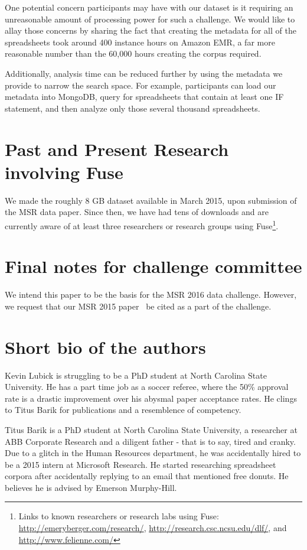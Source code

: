 \documentclass[conference]{IEEEtran}
\begin{document}
One potential concern participants may have with our dataset is it requiring an unreasonable amount of processing power for such a challenge.
We would like to allay those concerns by sharing the fact that creating the metadata for all of the spreadsheets took around 400 instance hours on Amazon EMR, a far more reasonable number than the 60,000 hours creating the corpus required.

Additionally, analysis time can be reduced further by using the metadata we provide to narrow the search space.
For example, participants can load our metadata into MongoDB, query for spreadsheets that contain at least one IF statement, and then analyze only those several thousand spreadsheets.

\section{Past and Present Research involving Fuse}
We made the roughly 8 GB dataset available in March 2015, upon submission of the MSR data paper.  
Since then, we have had tens of downloads and are currently aware of at least three researchers or research groups using Fuse\footnote{Links to known researchers or research labs using Fuse: \url{http://emeryberger.com/research/}, \url{http://research.csc.ncsu.edu/dlf/}, and \url{http://www.felienne.com/}}.




\section{Final notes for challenge committee}
We intend this paper to be the basis for the MSR 2016 data challenge.  
However, we request that our MSR 2015 paper~\cite{barik2015} be cited as a part of the challenge.


\section{Short bio of the authors}

Kevin Lubick is struggling to be a PhD student at North Carolina State University.  He has a part time job as a soccer referee, where the 50\% approval rate is a drastic improvement over his abysmal paper acceptance rates.  He clings to Titus Barik for publications and a resemblence of competency.

Titus Barik is a PhD student at North Carolina State University, a researcher at ABB Corporate Research and a diligent father - that is to say, tired and cranky.  Due to a glitch in the Human Resources department, he was accidentally hired to be a 2015 intern at Microsoft Research.  He started researching spreadsheet corpora after accidentally replying to an email that mentioned free donuts.  He believes he is advised by Emerson Murphy-Hill.
\end{document}

